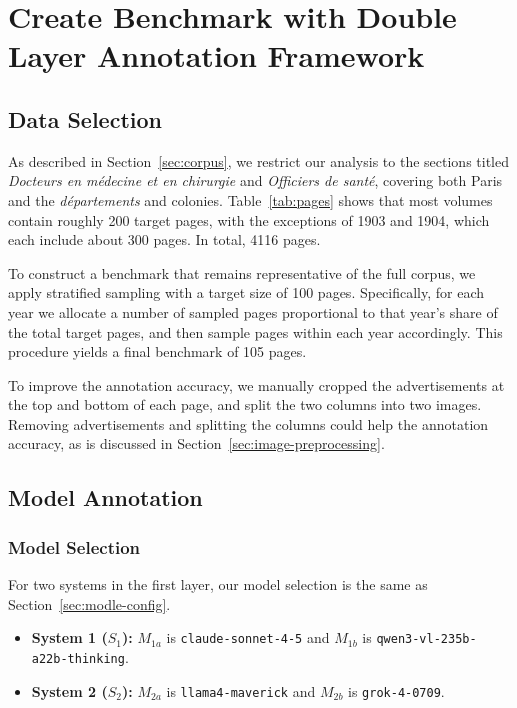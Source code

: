 \chapter{Create Benchmark with Double Layer Annotation Framework}

\section{Data Selection}

As described in Section~\ref{sec:corpus}, we restrict our analysis to the sections titled \emph{Docteurs en médecine et en chirurgie} and \emph{Officiers de santé}, covering both Paris and the \emph{départements} and colonies. Table~\ref{tab:pages} shows that most volumes contain roughly 200 target pages, with the exceptions of 1903 and 1904, which each include about 300 pages. In total, 4116 pages.

To construct a benchmark that remains representative of the full corpus, we apply stratified sampling with a target size of 100 pages. Specifically, for each year we allocate a number of sampled pages proportional to that year’s share of the total target pages, and then sample pages within each year accordingly. This procedure yields a final benchmark of 105 pages.

To improve the annotation accuracy, we manually cropped the advertisements at the top and bottom of each page, and split the two columns into two images. Removing advertisements and splitting the columns could help the annotation accuracy, as is discussed in Section~\ref{sec:image-preprocessing}.

\section{Model Annotation}
\subsection{Model Selection}
For two systems in the first layer, our model selection is the same as Section~\ref{sec:modle-config}.
\begin{itemize}
    \item \textbf{System 1 ($S_1$):} $M_{1a}$ is \texttt{claude-sonnet-4-5} and $M_{1b}$ is \texttt{qwen3-vl-235b-a22b-thinking}. 
    \item \textbf{System 2 ($S_2$):} $M_{2a}$ is \texttt{llama4-maverick} and $M_{2b}$ is \texttt{grok-4-0709}. 
\end{itemize}

